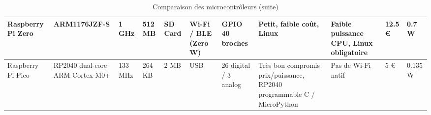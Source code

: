 \begin{landscape}
\begin{table}[!ht]
\begin{tabularx}{\textwidth}{
            |p{3.5cm}|p{2.5cm}|p{2.2cm}|p{1.2cm}|p{1.4cm}|
            p{2.7cm}|p{2.5cm}|p{3cm}|p{3cm}|p{1.8cm}|p{2.2cm}|
            }
            Raspberry Pi Zero                & ARM1176JZF-S                      & 1 GHz                 & 512 MB                  & SD Card        & Wi-Fi / BLE (Zero W) & GPIO 40 broches        & Petit, faible coût, Linux                                              & Faible puissance CPU, Linux obligatoire             & 12.5 € & 0.7 W   \\
            \hline
            Raspberry Pi Pico                & RP2040 dual-core ARM Cortex-M0+   & 133 MHz               & 264 KB                  & 2 MB           & USB                  & 26 digital / 3 analog  & Très bon compromis prix/puissance, RP2040 programmable C / MicroPython & Pas de Wi-Fi natif                                  & 5 €    & 0.135 W \\
            \hline
        \end{tabularx}
        \caption{Comparaison des microcontrôleurs (suite)}
    \end{table}


\end{landscape}
